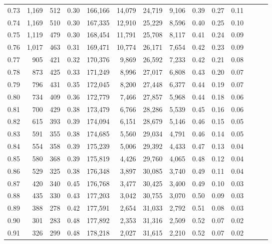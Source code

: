 \begin{tabular}{rrrrrrrrrrrrrr}
0.73 &  1,169 &  512 &  0.30 &  166,166 &   14,079 &  24,719 &   9,106 &  0.39 &  0.27 &      0.11 \\
0.74 &  1,169 &  510 &  0.30 &  167,335 &   12,910 &  25,229 &   8,596 &  0.40 &  0.25 &      0.10 \\
0.75 &  1,119 &  479 &  0.30 &  168,454 &   11,791 &  25,708 &   8,117 &  0.41 &  0.24 &      0.09 \\
0.76 &  1,017 &  463 &  0.31 &  169,471 &   10,774 &  26,171 &   7,654 &  0.42 &  0.23 &      0.09 \\
0.77 &    905 &  421 &  0.32 &  170,376 &    9,869 &  26,592 &   7,233 &  0.42 &  0.21 &      0.08 \\
0.78 &    873 &  425 &  0.33 &  171,249 &    8,996 &  27,017 &   6,808 &  0.43 &  0.20 &      0.07 \\
0.79 &    796 &  431 &  0.35 &  172,045 &    8,200 &  27,448 &   6,377 &  0.44 &  0.19 &      0.07 \\
0.80 &    734 &  409 &  0.36 &  172,779 &    7,466 &  27,857 &   5,968 &  0.44 &  0.18 &      0.06 \\
0.81 &    700 &  429 &  0.38 &  173,479 &    6,766 &  28,286 &   5,539 &  0.45 &  0.16 &      0.06 \\
0.82 &    615 &  393 &  0.39 &  174,094 &    6,151 &  28,679 &   5,146 &  0.46 &  0.15 &      0.05 \\
0.83 &    591 &  355 &  0.38 &  174,685 &    5,560 &  29,034 &   4,791 &  0.46 &  0.14 &      0.05 \\
0.84 &    554 &  358 &  0.39 &  175,239 &    5,006 &  29,392 &   4,433 &  0.47 &  0.13 &      0.04 \\
0.85 &    580 &  368 &  0.39 &  175,819 &    4,426 &  29,760 &   4,065 &  0.48 &  0.12 &      0.04 \\
0.86 &    529 &  325 &  0.38 &  176,348 &    3,897 &  30,085 &   3,740 &  0.49 &  0.11 &      0.04 \\
0.87 &    420 &  340 &  0.45 &  176,768 &    3,477 &  30,425 &   3,400 &  0.49 &  0.10 &      0.03 \\
0.88 &    435 &  330 &  0.43 &  177,203 &    3,042 &  30,755 &   3,070 &  0.50 &  0.09 &      0.03 \\
0.89 &    388 &  278 &  0.42 &  177,591 &    2,654 &  31,033 &   2,792 &  0.51 &  0.08 &      0.03 \\
0.90 &    301 &  283 &  0.48 &  177,892 &    2,353 &  31,316 &   2,509 &  0.52 &  0.07 &      0.02 \\
0.91 &    326 &  299 &  0.48 &  178,218 &    2,027 &  31,615 &   2,210 &  0.52 &  0.07 &      0.02 \\

\end{tabular}
